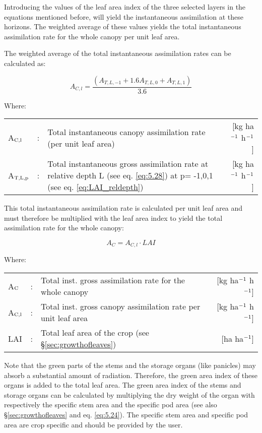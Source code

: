 Introducing the values of the leaf area index of the three selected layers in the equations
mentioned before, will yield the instantaneous assimilation at these horizons. The
weighted average of these values yields the total instantaneous assimilation rate for the
whole canopy per unit leaf area.

The weighted average of the total instantaneous assimilation rates can be calculated as:

\begin{equation}
A_{C,l} = {\frac{(A_{T,L,-1} + 1.6 A_{T,L,0} + A_{T,L,1})}{3.6}}
\end{equation}

Where:\\[5pt]
\begin{tabularx}{\textwidth}{llXr}
	A$_{{\rm C,l}}$ &:& Total instantaneous canopy assimilation 
	rate (per unit leaf area)    &    [kg ha$^{{\rm -1}}$ h$^{{\rm -1}}$]\\
	A$_{{\rm T,L,p}}$ &:& Total instantaneous gross assimilation rate at relative 
	depth L (see eq. \ref{eq:5.28}) at p= -1,0,1 (see eq. \ref{eq:LAI_reldepth})    &    
	[kg ha$^{{\rm -1}}$ h$^{{\rm -1}}$]\\
\end{tabularx}

This total instantaneous assimilation rate is calculated per unit leaf area and must
therefore be multiplied with the leaf area index to yield the total assimilation rate for the
whole canopy:

\begin{equation}
\label{eq:5.31}
A_{C} = A_{C,l} \cdot LAI
\end{equation}

Where:\\[5pt]
\begin{tabularx}{\textwidth}{llXr}
	A$_{{\rm C}}$ &:& Total inst. gross assimilation rate for
	the whole canopy  &  [kg ha$^{{\rm -1}}$ h$^{{\rm -1}}$]\\
	A$_{{\rm C,l}}$ &:& Total inst. gross canopy assimilation rate 
	per unit leaf area &  [kg ha$^{{\rm -1}}$ h$^{{\rm -1}}$]\\
	LAI &:& Total leaf area of the crop (see \S \ref{sec:growthofleaves})  & [ha ha$^{{\rm -1}}$]\\
\end{tabularx}

Note that the green parts of the stems and the storage organs (like panicles) may absorb a
substantial amount of radiation. Therefore, the green area index of these organs is added
to the total leaf area. The green area index of the stems and storage organs can be
calculated by multiplying the dry weight of the organ with respectively the specific stem
area and the specific pod area (see also \S \ref{sec:growthofleaves} and eq. \ref{eq:5.24}). The specific 
stem area and specific pod area are crop specific and should be provided by the user.


